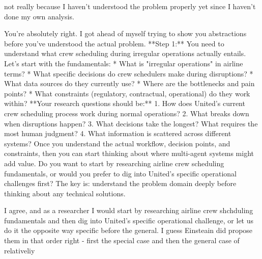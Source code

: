 \begin{userprompt}
not really because I haven't understood the problem properly yet since I haven't done my own analysis.
\end{userprompt}

\begin{botresponse}
You're absolutely right. I got ahead of myself trying to show you abstractions before you've understood the actual problem.
**Step 1:** You need to understand what crew scheduling during irregular operations actually entails.
Let's start with the fundamentals:
*   What is "irregular operations" in airline terms?
*   What specific decisions do crew schedulers make during disruptions?
*   What data sources do they currently use?
*   Where are the bottlenecks and pain points?
*   What constraints (regulatory, contractual, operational) do they work within?
**Your research questions should be:**
1.  How does United's current crew scheduling process work during normal operations?
2.  What breaks down when disruptions happen?
3.  What decisions take the longest? What requires the most human judgment?
4.  What information is scattered across different systems?
Once you understand the actual workflow, decision points, and constraints, then you can start thinking about where multi-agent systems might add value.
Do you want to start by researching airline crew scheduling fundamentals, or would you prefer to dig into United's specific operational challenges first?
The key is: understand the problem domain deeply before thinking about any technical solutions.
\end{botresponse}

\begin{userprompt}
I agree, and as a researcher I would start by researching airline crew shchduling fundamentals and then dig into United's specific operational challenge, or let us do it the opposite way specific before the general. I guess Einsteain did propose them in that order right - first the special case and then the general case of relativeliy
\end{userprompt}


